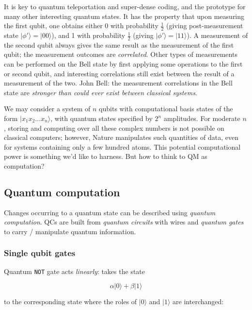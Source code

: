 \documentclass{article}
\numberwithin{equation}{section}
\newcommand{\bracket}[1]{|#1\rangle}
\begin{document}
It is key to quantum teleportation and super-dense coding, and the prototype for many other interesting quantum states. It has the property that upon measuring the first qubit, one obtains either 0 with probability $\frac{1}{2}$ (giving post-measurement state $\bracket{\phi'} = \bracket{00}$), and 1 with probability $\frac{1}{2}$ (giving $\bracket{\phi'} = \bracket{11}$). A measurement of the second qubit always gives the same result as the measurement of the first qubit; the measurement outcomes are \textit{correlated}. Other types of measurements can be performed on the Bell state by first applying some operations to the first or second qubit, and interesting correlations still exist between the result of a measurement of the two. John Bell: the measurement correlations in the Bell state are \textit{stronger than could ever exist between classical systems}.

We may consider a system of $n$ qubits with computational basis states of the form $\bracket{x_1 x_2 ... x_n}$, with quantum states specified by $2^n$ amplitudes. For moderate $n$, storing and computing over all these complex numbers is not possible on classical computers; however, Nature manipulates such quantities of data, even for systems containing only a few hundred atoms. This potential computational power is something we'd like to harness. But how to think to QM as computation?

\subsection{Quantum computation}

Changes occurring to a quantum state can be described using \textit{quantum computation}. QCs are built from \textit{quantum circuits} with wires and \textit{quantum gates} to carry / manipulate quantum information.

\subsubsection{Single qubit gates}

Quantum \texttt{NOT} gate acts \textit{linearly}: takes the state

\begin{equation} \label{eq:1.8}
\alpha \bracket{0} + \beta \bracket{1}
\end{equation}

to the corresponding state where the roles of $\bracket{0}$ and $\bracket{1}$ are interchanged:
\end{document}

